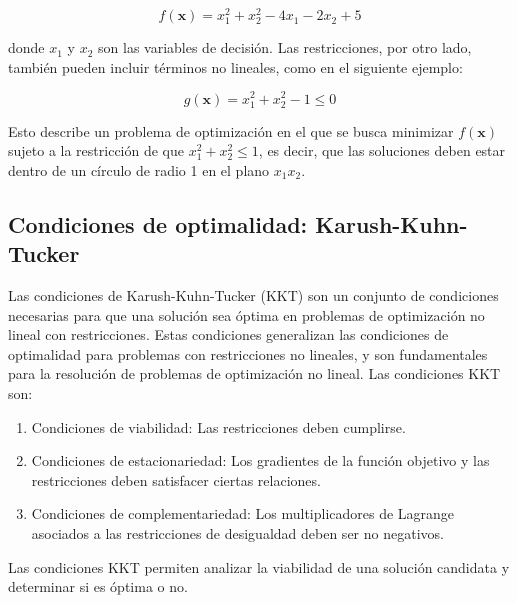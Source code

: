 $$
f(\mathbf{x})=x_{1}^{2}+x_{2}^{2}-4 x_{1}-2 x_{2}+5
$$

\begin{flushleft}
	donde $x_{1}$ y $x_{2}$ son las variables de decisión. Las restricciones, por otro lado, también pueden incluir términos no lineales, como en el siguiente ejemplo:
\end{flushleft}

$$
g(\mathbf{x})=x_{1}^{2}+x_{2}^{2}-1 \leq 0
$$

\begin{flushleft}
	Esto describe un problema de optimización en el que se busca minimizar $f(\mathbf{x})$ sujeto a la restricción de que $x_{1}^{2}+x_{2}^{2} \leq 1$, es decir, que las soluciones deben estar dentro de un círculo de radio 1 en el plano $x_{1} x_{2}$.
\end{flushleft}

\subsection{Condiciones de optimalidad: Karush-Kuhn-Tucker}

\begin{flushleft}
	Las condiciones de Karush-Kuhn-Tucker (KKT) son un conjunto de condiciones necesarias para que una solución sea óptima en problemas de optimización no lineal con restricciones. Estas condiciones generalizan las condiciones de optimalidad para problemas con restricciones no lineales, y son fundamentales para la resolución de problemas de optimización no lineal. Las condiciones KKT son:
\end{flushleft}

\begin{enumerate}
	\item Condiciones de viabilidad: Las restricciones deben cumplirse.
	\item Condiciones de estacionariedad: Los gradientes de la función objetivo y las restricciones deben satisfacer ciertas relaciones.
	\item Condiciones de complementariedad: Los multiplicadores de Lagrange asociados a las restricciones de desigualdad deben ser no negativos.
\end{enumerate}

\begin{flushleft}
	Las condiciones KKT permiten analizar la viabilidad de una solución candidata y determinar si es óptima o no.
\end{flushleft}

